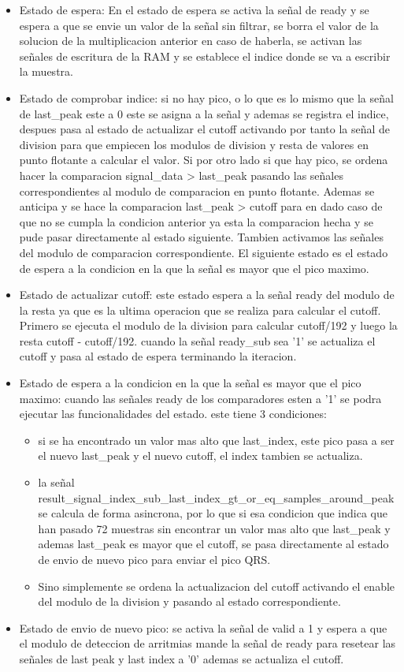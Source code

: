 \begin{itemize}
    \item Estado de espera: En el estado de espera se activa la señal de ready y se espera a que se envie un valor de la
    señal sin filtrar, se borra el valor de la solucion de la multiplicacion anterior en caso de haberla, se activan las
    señales de escritura de la RAM y se establece el indice donde se va a escribir la muestra.
    \item Estado de comprobar indice: si no hay pico, o lo que es lo mismo que la señal de last\_peak este a 0 este se asigna
     a la señal y ademas se registra el indice, despues pasa al estado de actualizar el cutoff activando por tanto la señal de 
     division para que empiecen los modulos de division y resta de valores en punto flotante a calcular el valor. Si por otro
     lado si que hay pico, se ordena hacer la comparacion signal\_data > last\_peak pasando las señales correspondientes al modulo de comparacion en 
     punto flotante. Ademas se anticipa y se hace la comparacion last\_peak > cutoff para en dado caso de que no se cumpla la 
     condicion anterior ya esta la comparacion hecha y se pude pasar directamente al estado siguiente. Tambien activamos las señales
     del modulo de comparacion correspondiente. El siguiente estado es el estado de espera a la condicion en la que la señal es mayor 
     que el pico maximo.
    \item Estado de actualizar cutoff: este estado espera a la señal ready del modulo de la resta ya que es la ultima operacion que se realiza para 
    calcular el cutoff. Primero se ejecuta el modulo de la division para calcular cutoff/192 y luego la resta cutoff - cutoff/192. cuando la señal
    ready\_sub sea '1' se actualiza el cutoff y pasa al estado de espera terminando la iteracion. 
    \item Estado de espera a la condicion en la que la señal es mayor que el pico maximo: cuando las señales ready de los comparadores esten a '1' 
    se podra ejecutar las funcionalidades del estado. este tiene 3 condiciones:
    \begin{itemize}
        \item si se ha encontrado un valor mas alto que last\_index, este pico pasa a ser el nuevo last\_peak y el nuevo cutoff, el index tambien se actualiza. 
        \item la señal result\_signal\_index\_sub\_last\_index\_gt\_or\_eq\_samples\_around\_peak se calcula de forma asincrona, por lo que si esa condicion que
         indica que han pasado 72 muestras sin encontrar un valor mas alto que last\_peak y ademas last\_peak es mayor que el cutoff, se pasa directamente al estado
         de envio de nuevo pico para enviar el pico QRS.
        \item Sino simplemente se ordena la actualizacion del cutoff activando el enable del modulo de la division y pasando al estado correspondiente.
    \end{itemize}
    \item Estado de envio de nuevo pico: se activa la señal de valid a 1 y espera a que el modulo de deteccion de arritmias mande la señal de ready para resetear 
    las señales de last peak y last index a '0' ademas se actualiza el cutoff.
\end{itemize}
